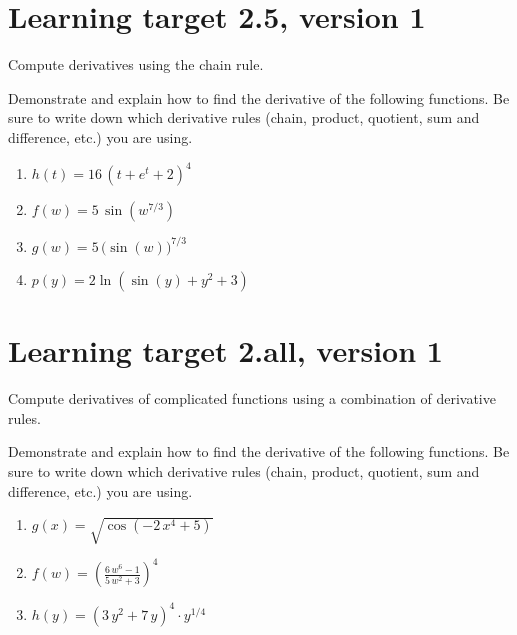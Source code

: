 \pagebreak

\section{Learning target 2.5, version 1}

Compute derivatives using the chain rule.

\hrulefill

Demonstrate and explain how to find the derivative of the following functions. Be sure to write down which derivative rules (chain, product, quotient, sum and difference, etc.) you are using.

\begin{enumerate}
    \item \(h(t)= 16 \, {\left(t + e^{t} + 2\right)}^{4}\)
    \vfill
    \item \(f(w)= 5 \, \sin\left(w^{7/3}\right)\)
    \vfill
    \item \(g(w)= 5 \, \Big(\sin\left(w\right)\Big)^{7/3}\)
    \vfill
    \item \(p(y) = 2\ln\left(\sin(y) + y^2 + 3\right)\)
    \vfill
\end{enumerate}

\pagebreak

\section{Learning target 2.all, version 1}

Compute derivatives of complicated functions using a combination of derivative rules.

\hrulefill

Demonstrate and explain how to find the derivative of the following functions. Be sure to write down which derivative rules (chain, product, quotient, sum and difference, etc.) you are using.

\begin{enumerate}
    \item \(g(x) = \sqrt{\cos\left(-2 \, x^{4} + 5\right)}\)
    \vfill
    \item \(f(w) = \left( \frac{6 \, w^{6} - 1}{5 \, w^2 + 3} \right)^{ 4 }\)
    \vfill
    \item \(h(y) = {\left(3 \, y^{2} + 7 \, y\right)}^{4}\cdot y^{1/4}\)
    \vfill
\end{enumerate}

